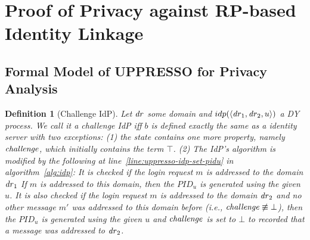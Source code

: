 \documentclass[letterpaper,onecolumn,10pt]{article}
\newtheorem{definition}{Definition}
\begin{document}
\section{Proof of Privacy against RP-based Identity Linkage}

\subsection{Formal Model of UPPRESSO for Privacy Analysis}

\begin{definition}[Challenge IdP]
  Let $\mathit{dr}$ some domain and 
  $idp(\langle {{}\mathit{dr}_1, \mathit{dr}_2, u} \rangle)$ a DY process. 
  We call it a \emph{challenge IdP} iff $b$
  is defined exactly the same as a identity server with two 
  exceptions: (1) the state contains one more property, 
  namely $\mathit{challenge}$, which initially contains the term 
  $\top$. 
  (2) The IdP's algorithm is modified by the following at 
  line~\ref{line:uppresso-idp-set-pidu} in 
  algorithm~\ref{alg:idp}: It is checked if the login 
  request $m$ is addressed to the domain $\mathit{dr}_1$ 
  If $m$ is addressed to this domain, then the $PID_u$ is 
  generated using the given $u$.
  It is also checked if the login request $m$ is addressed 
  to the domain $\mathit{dr}_2$ and no other message $m'$ was 
  addressed to this domain before (i.e., $\mathit{challenge} 
  \not\equiv \bot$), then the $PID_u$ is generated using 
  the given $u$ and $\mathit{challenge}$ is set to $\bot$ to 
  recorded that a message was addressed to $\mathit{dr}_2$.
\end{definition}
\end{document}
